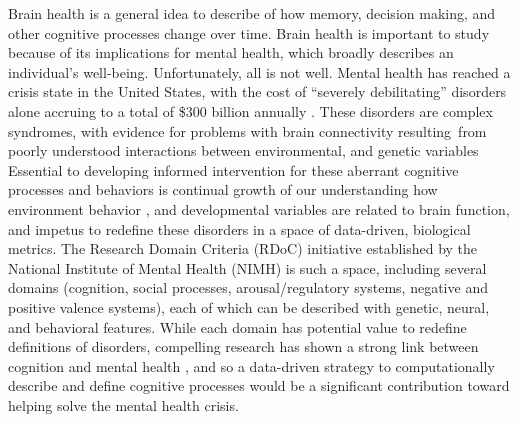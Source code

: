 \documentclass{report}
\begin{document}
Brain health is a general idea to describe of how memory, decision making, and other cognitive processes change over time. Brain health is important to study because of its implications for mental health, which broadly describes an individual's well-being. Unfortunately, all is not well.
Mental health has reached a crisis state in the United States, with the
cost of ``severely debilitating'' disorders alone accruing to a total of
\$300 billion annually \cite{noauthor_undated-ou}.
These disorders are complex syndromes, with evidence for problems with
brain connectivity \cite{Horwitz2012-ci,Fornito2015-rv}
resulting~from poorly understood interactions between environmental, and
genetic variables \cite{McCarroll2013-hi}
Essential to developing informed intervention for these aberrant
cognitive processes and behaviors is continual growth of our
understanding how environment \cite{DeWit2000-wh}
behavior \cite{Schmidt2007-cs},
and developmental variables \cite{Broman1999-dq,Ten_Donkelaar2014-ps} are
related to brain function, and impetus to redefine these disorders in a space of data-driven, biological metrics. The Research Domain Criteria (RDoC) initiative \cite{Insel2009-vi} established by the National Institute of Mental Health (NIMH) is such a space, including several domains (cognition, social processes, arousal/regulatory systems, negative and positive valence systems), each of which can be described with genetic, neural, and behavioral features. While each domain has potential value to redefine definitions of disorders, compelling research has shown a strong link between cognition and mental health \cite{Etkin2013-lo}, and so a data-driven strategy to computationally describe and define cognitive processes would be a significant contribution toward helping solve the mental health crisis.
\end{document}
